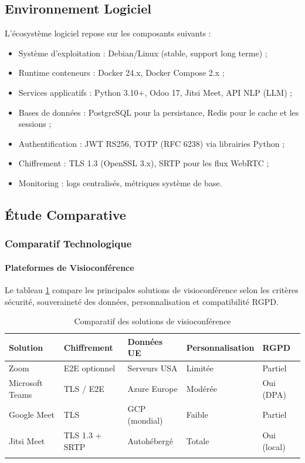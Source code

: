 \subsection{Environnement Logiciel}
L'écosystème logiciel repose sur les composants suivants :
\begin{itemize}
    \item Système d'exploitation : Debian/Linux (stable, support long terme) ;
    \item Runtime conteneurs : Docker 24.x, Docker Compose 2.x ;
    \item Services applicatifs : Python 3.10+, Odoo 17, Jitsi Meet, API NLP (LLM) ;
    \item Bases de données : PostgreSQL pour la persistance, Redis pour le cache et les sessions ;
    \item Authentification : JWT RS256, TOTP (RFC 6238) via librairies Python ;
    \item Chiffrement : TLS 1.3 (OpenSSL 3.x), SRTP pour les flux WebRTC ;
    \item Monitoring : logs centralisés, métriques système de base.
\end{itemize}

\subsection{Étude Comparative}

\subsubsection{Comparatif Technologique}

\paragraph{Plateformes de Visioconférence}
Le tableau \ref{tab:visio} compare les principales solutions de visioconférence selon les critères sécurité, souveraineté des données, personnalisation et compatibilité RGPD.

\begin{longtable}{|m{3.5cm}|m{2.5cm}|m{2.5cm}|m{2.5cm}|m{1.5cm}|}
\hline
\textbf{Solution} & \textbf{Chiffrement} & \textbf{Données UE} & \textbf{Personnalisation} & \textbf{RGPD} \\
\hline
\endhead
\endfoot
\endlastfoot
\hline
Zoom & E2E optionnel & Serveurs USA & Limitée & Partiel \\
\hline
Microsoft Teams & TLS / E2E & Azure Europe & Modérée & Oui (DPA) \\
\hline
Google Meet & TLS & GCP (mondial) & Faible & Partiel \\
\hline
Jitsi Meet & TLS 1.3 + SRTP & Autohébergé & Totale & Oui (local) \\
\hline
\captionsetup{justification=centering,margin=2cm}
\caption{Comparatif des solutions de visioconférence}
\label{tab:visio}
\end{longtable}


